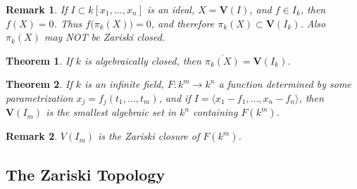 \documentclass{article}
\theoremstyle{mystyle}
\newtheorem{theorem}{Theorem}[section]
\newtheorem{remark}{Remark}[section]
\begin{document}
\begin{remark}
If $I\subset k[x_1,\hdots ,x_n]$ is an ideal, $X = \mathbf{V}(I)$, and $f\in I_k$, then $f(X) = 0$. Thus $f\big(\pi_{k}(X)\big)=0$, and therefore $\pi_{k}(X) \subset \mathbf{V}(I_k)$. Also $\pi_{k}(X)$ may NOT be Zariski closed.
\end{remark}
\begin{theorem}
If $k$ is algebraically closed, then $\overline{\pi_k(X)} = \mathbf{V}(I_k)$.
\end{theorem}
\begin{theorem}
If $k$ is an infinite field, $F:k^m \rightarrow k^n$ a function determined by some parametrization $x_j = f_j(t_1,\hdots, t_m)$, and if $I = \langle x_1-f_1,\hdots, x_n-f_n\rangle$, then $\mathbf{V}(I_m)$ is the smallest algebraic set in $k^n$ containing $F(k^m)$.
\end{theorem}
\begin{remark}
$V(I_m)$ is the Zariski closure of $F(k^m)$.
\end{remark}
\subsection{The Zariski Topology}
\end{document}
